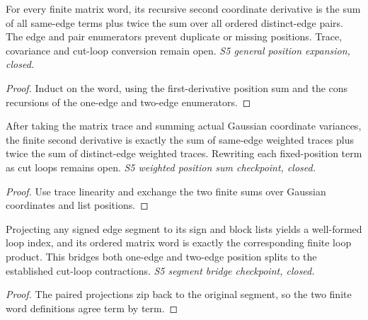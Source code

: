 \begin{lemma}
  \label{lem:loop-second-position-sum}
  \leanok
  For every finite matrix word, its recursive second coordinate derivative
  is the sum of all same-edge terms plus twice the sum over all ordered
  distinct-edge pairs. The edge and pair enumerators prevent duplicate or
  missing positions. Trace, covariance and cut-loop conversion remain open.
  \emph{S5 general position expansion, closed.}
\end{lemma}
\begin{proof}\leanok
  Induct on the word, using the first-derivative position sum and the cons
  recursions of the one-edge and two-edge enumerators.
\end{proof}

\begin{lemma}
  \label{lem:loop-second-trace-sum}
  \leanok
  After taking the matrix trace and summing actual Gaussian coordinate
  variances, the finite second derivative is exactly the sum of same-edge
  weighted traces plus twice the sum of distinct-edge weighted traces.
  Rewriting each fixed-position term as cut loops remains open.
  \emph{S5 weighted position sum checkpoint, closed.}
\end{lemma}
\begin{proof}\leanok
  Use trace linearity and exchange the two finite sums over Gaussian
  coordinates and list positions.
\end{proof}

\begin{lemma}
  \label{lem:loop-position-segment-bridge}
  \leanok
  Projecting any signed edge segment to its sign and block lists yields a
  well-formed loop index, and its ordered matrix word is exactly the
  corresponding finite loop product. This bridges both one-edge and
  two-edge position splits to the established cut-loop contractions.
  \emph{S5 segment bridge checkpoint, closed.}
\end{lemma}
\begin{proof}\leanok
  The paired projections zip back to the original segment, so the two
  finite word definitions agree term by term.
\end{proof}

